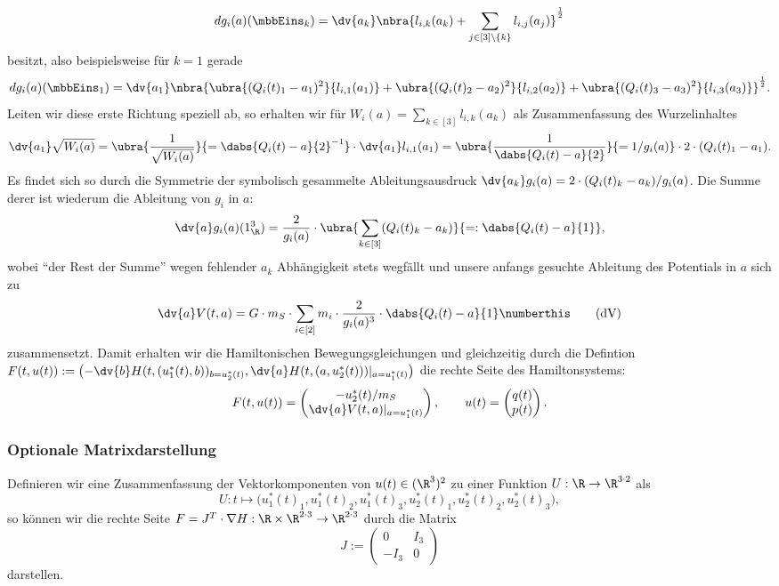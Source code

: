 \documentclass{subfiles}
\begin{document}
        \[
            dg_i(a)(\mbbEins_k) = \dv{a_k}\nbra{l_{i,k}(a_k) + \sum_{j\in[3]\setminus{\{k\}}}l_{i,j}(a_j)}^{\frac12}
        \]
        besitzt, also beispielsweise für $k=1$ gerade
        \[
            dg_i(a)(\mbbEins_1) = \dv{a_1}\nbra{\ubra{(Q_i(t)_1 - a_1)^2}{l_{i,1}(a_1)} + \ubra{(Q_i(t)_2 - a_2)^2}{l_{i,2}(a_2)} + \ubra{(Q_i(t)_3 - a_3)^2}{l_{i,3}(a_3)}}^{\frac12}.
        \]
        Leiten wir diese erste Richtung speziell ab, so erhalten wir für $W_i(a) = \sum_{k\in[3]}l_{i,k}(a_k)$ als Zusammenfassung des Wurzelinhaltes
        \[
            \dv{a_1}\sqrt{W_i(a)} = \ubra{\frac{1}{\sqrt{W_i(a)}}}{=\dabs{Q_i(t) - a}{2}^{-1}}\cdot\dv{a_1}l_{i,1}(a_1) = \ubra{\frac{1}{\dabs{Q_i(t) - a}{2}}}{= 1/g_i(a)}\cdot 2\cdot (Q_i(t)_1 - a_1). 
        \]
        Es findet sich so durch die Symmetrie der symbolisch gesammelte Ableitungsausdruck $\dv{a_k}g_i(a) = 2\cdot (Q_i(t)_k - a_k) / g_i(a)$. Die Summe derer ist wiederum die Ableitung von $g_i$ in $a$:
        \[
            \dv{a}g_i(a)(1_\R^3) = \frac{2}{g_i(a)}\cdot\ubra{\sum_{k\in[3]}(Q_i(t)_k - a_k)}{=:\dabs{Q_i(t) - a}{1}},
        \]
        wobei \enquote{der Rest der Summe} wegen fehlender $a_k$ Abhängigkeit stets wegfällt und unsere anfangs gesuchte Ableitung des Potentials in $a$ sich zu 
        \[
            \dv{a}V(t,a) = G\cdot m_S\cdot\sum_{i\in[2]}m_i\cdot\frac{2}{g_i(a)^3}\cdot\dabs{Q_i(t) - a}{1}\numberthis\label{eq:dV}\tag{dV}
        \]
        zusammensetzt. Damit erhalten wir die Hamiltonischen Bewegungsgleichungen und gleichzeitig durch die Defintion $F(t,u(t)):=\bigl(-\dv{b}H(t,(u_1^*(t),b))_{b=u_2^*(t)},\dv{a}H(t,(a,u_2^*(t)))|_{a=u_1^*(t)}\bigr)$ die rechte Seite des Hamiltonsystems:
        \begin{align*}
            F(t,u(t)) = \begin{pmatrix}
                -u_2^*(t)/m_S\\
                \dv{a}V(t,a)|_{a=u_1^* (t)}
            \end{pmatrix}, \qquad u(t) = \begin{pmatrix}
                q(t)\\
                p(t)
            \end{pmatrix}.
        \end{align*}

    \subsubsection*{Optionale Matrixdarstellung}
        Definieren wir eine Zusammenfassung der Vektorkomponenten von $u(t)\in(\R^3)^2$ zu einer Funktion $U:\R\to\R^{3\cdot 2}$ als
        \[
            U:t\mapsto \bigl(u_1^*(t)_1,u_1^*(t)_2,u_1^*(t)_3,u_2^*(t)_1,u_2^*(t)_2,u_2^*(t)_3\bigr),
        \]
        so können wir die rechte Seite $F=J^T\cdot\nabla H:\R\times\R^{2\cdot 3}\to\R^{2\cdot 3}$ durch die Matrix
        \[
            J:=\begin{pmatrix}
                0 & I_{3} \\
                -I_{3} & 0
            \end{pmatrix}
        \]
        darstellen.
\end{document}
